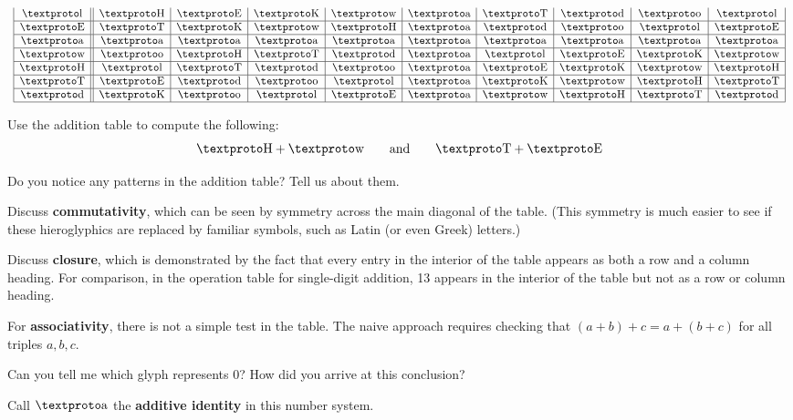 \begin{fullwidth}
\[{\begin{array}{clc}
{\begin{array}{|c||c|c|c|c|c|c|c|c|c|}
\lh   & \lb & \lf & \ld & \la & \lo & \lc &\loo & \li & \lh \\ \hline
\lf   & \lc & \ld & \la & \lb & \lo &\loo & \li & \lh & \lf \\ \hline
\lo   & \lo & \lo & \lo & \lo & \lo & \lo & \lo & \lo & \lo \\ \hline
\la   & \li & \lb & \lc &\loo & \lo & \lh & \lf & \ld & \la \\ \hline
\lb   & \lh & \lc &\loo & \li & \lo & \lf & \ld & \la & \lb \\ \hline
\lc   & \lf &\loo & \li & \lh & \lo & \ld & \la & \lb & \lc \\ \hline
\loo  & \ld & \li & \lh & \lf & \lo & \la & \lb & \lc &\loo \\ \hline
\end{array}}
\end{array}}
\]
\end{fullwidth}
\newpage

\begin{prob} 
Use the addition table to compute the following:
\[
\lb + \la \qquad\text{and}\qquad \lc + \lf
\]
\end{prob}

\begin{prob} 
Do you notice any patterns in the addition table? Tell us about them.
\begin{teachingnote}
Discuss \textbf{commutativity}, which can be seen by symmetry across the main diagonal of the table.  (This symmetry is much easier to see if these hieroglyphics are replaced by familiar symbols, such as Latin (or even Greek) letters.)  

Discuss \textbf{closure}, which is demonstrated by the fact that every entry in the interior of the table appears as both a row and a column heading.  For comparison, in the operation table for single-digit addition, 13 appears in the interior of the table but not as a row or column heading.  

For \textbf{associativity}, there is not a simple test in the table.  The naive approach requires checking that $(a + b) + c = a + (b + c)$ for all triples $a, b, c$.  
\end{teachingnote}
\end{prob}

\begin{prob} 
Can you tell me which glyph represents $0$? How did you arrive at this
conclusion?
\begin{teachingnote}
Call $\lo$ the \textbf{additive identity} in this number system.
\end{teachingnote}
\end{prob}

